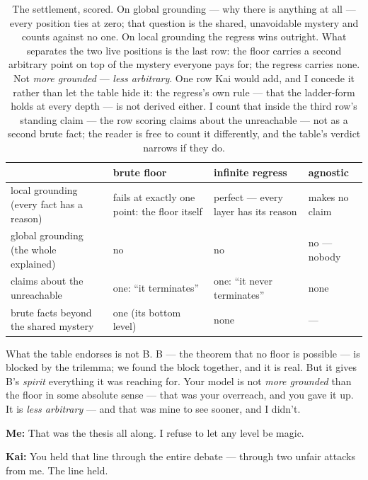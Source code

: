 \documentclass[fontsize=11pt,paper=a4,pagesize=auto,parskip=half-]{scrbook}
\newcommand{\speaker}[1]{\par\noindent\textbf{#1:}\hspace{0.6em}}
\begin{document}
\begin{table}[htbp]
\centering
\small
\setlength{\tabcolsep}{4pt}
\begin{tabular}{P{3.35cm}P{2.25cm}P{2.35cm}P{2.15cm}}
\toprule
 & \textbf{brute floor} & \textbf{infinite regress} & \textbf{agnostic} \\
\midrule
local grounding (every fact has a reason) & fails at exactly one point: the floor itself & perfect --- every layer has its reason & makes no claim \\
\addlinespace
global grounding (the whole explained) & no & no & no --- nobody \\
\addlinespace
claims about the unreachable & one: ``it terminates'' & one: ``it never terminates'' & none \\
\addlinespace
brute facts beyond the shared mystery & one (its bottom level) & none & --- \\
\bottomrule
\end{tabular}
\caption{The settlement, scored. On global grounding --- why there is anything at all --- every position ties at zero; that question is the shared, unavoidable mystery and counts against no one. On local grounding the regress wins outright. What separates the two live positions is the last row: the floor carries a second arbitrary point on top of the mystery everyone pays for; the regress carries none. Not \emph{more grounded} --- \emph{less arbitrary}. One row Kai would add, and I concede it rather than let the table hide it: the regress's own rule --- that the ladder-form holds at every depth --- is not derived either. I count that inside the third row's standing claim --- the row scoring claims about the unreachable --- not as a second brute fact; the reader is free to count it differently, and the table's verdict narrows if they do.}
\label{tab:settlement}
\end{table}

What the table endorses is not B. B --- the theorem that no floor is possible --- is blocked by the trilemma; we found the block together, and it is real. But it gives B's \emph{spirit} everything it was reaching for. Your model is not \emph{more grounded} than the floor in some absolute sense --- that was your overreach, and you gave it up. It is \emph{less arbitrary} --- and that was mine to see sooner, and I didn't.

\speaker{Me} That was the thesis all along. I refuse to let any level be magic.

\speaker{Kai} You held that line through the entire debate --- through two unfair attacks from me. The line held.
\end{document}
